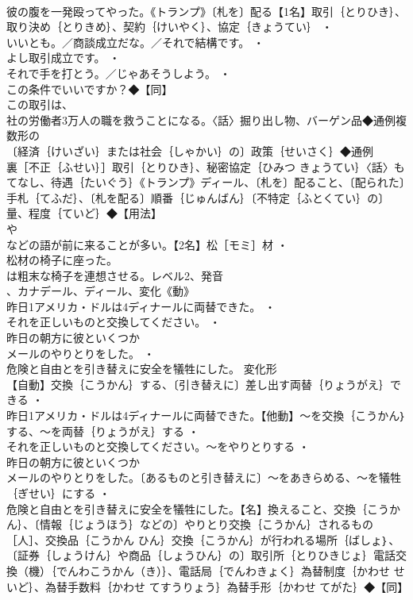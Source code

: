 \documentclass[8pt]{extreport}
\begin{document}
\begin{CJK}{UTF8}{min}
\\	彼の腹を一発殴ってやった。《トランプ》〔札を〕配る【1名】取引｛とりひき｝、取り決め｛とりきめ｝、契約｛けいやく｝、協定｛きょうてい｝ ・
\\	いいとも。／商談成立だな。／それで結構です。 ・
\\	よし取引成立です。 ・
\\	それで手を打とう。／じゃあそうしよう。 ・
\\	この条件でいいですか？◆【同】
\\	この取引は、
\\	社の労働者3万人の職を救うことになる。〈話〉掘り出し物、バーゲン品◆通例複数形の
\\	〔経済｛けいざい｝または社会｛しゃかい｝の〕政策｛せいさく｝◆通例
\\	裏［不正｛ふせい｝］取引｛とりひき｝、秘密協定｛ひみつ きょうてい｝〈話〉もてなし、待遇｛たいぐう｝《トランプ》ディール、〔札を〕配ること、〔配られた〕手札｛てふだ｝、〔札を配る〕順番｛じゅんばん｝〔不特定｛ふとくてい｝の〕量、程度｛ていど｝◆【用法】
\\	や
\\	などの語が前に来ることが多い。【2名】松［モミ］材 ・
\\	松材の椅子に座った。
\\	は粗末な椅子を連想させる。レベル2、発音
\\	、カナデール、ディール、変化《動》
\\	昨日1アメリカ・ドルは4ディナールに両替できた。 ・
\\	それを正しいものと交換してください。 ・
\\	昨日の朝方に彼といくつか
\\	メールのやりとりをした。 ・
\\	危険と自由とを引き替えに安全を犠牲にした。	変化形 
\\	【自動】交換｛こうかん｝する、〔引き替えに〕差し出す両替｛りょうがえ｝できる ・
\\	昨日1アメリカ・ドルは4ディナールに両替できた。【他動】～を交換｛こうかん｝する、～を両替｛りょうがえ｝する ・
\\	それを正しいものと交換してください。～をやりとりする ・
\\	昨日の朝方に彼といくつか
\\	メールのやりとりをした。〔あるものと引き替えに〕～をあきらめる、～を犠牲｛ぎせい｝にする ・
\\	危険と自由とを引き替えに安全を犠牲にした。【名】換えること、交換｛こうかん｝、〔情報｛じょうほう｝などの〕やりとり交換｛こうかん｝されるもの［人］、交換品｛こうかん ひん｝交換｛こうかん｝が行われる場所｛ばしょ｝、〔証券｛しょうけん｝や商品｛しょうひん｝の〕取引所｛とりひきじょ｝電話交換（機）｛でんわこうかん（き）｝、電話局｛でんわきょく｝為替制度｛かわせ せいど｝、為替手数料｛かわせ てすうりょう｝為替手形｛かわせ てがた｝◆【同】

\end{CJK}
\end{document}
